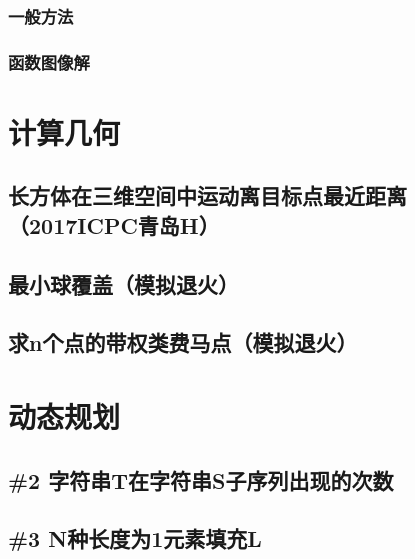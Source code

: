 \documentclass[twoside,a4paper]{article}
\begin{document}
\subsubsection{一般方法}

\subsubsection{函数图像解}


\section{计算几何}

\subsection{长方体在三维空间中运动离目标点最近距离（2017ICPC青岛H）}


\subsection{最小球覆盖（模拟退火）}


\subsection{求n个点的带权类费马点（模拟退火）}


\section{动态规划}

\subsection{\#2 字符串T在字符串S子序列出现的次数}


\subsection{\#3 N种长度为1元素填充L}

\end{document}
